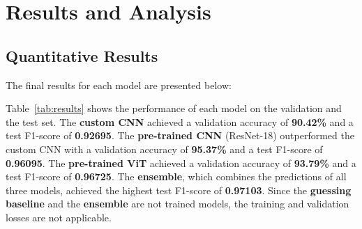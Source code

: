 \section{Results and Analysis}

\subsection{Quantitative Results}

The final results for each model are presented below:

\begin{table}[htbp]
    \caption{Quantitative results of the models on the train, validation and test set.}
    \begin{center}
    \end{center}
\end{table}

Table~\ref{tab:results} shows the performance of each model on the validation and the test set. The \textbf{custom CNN} achieved a validation accuracy of \textbf{90.42\%} and a test F1-score of \textbf{0.92695}. The \textbf{pre-trained CNN} (ResNet-18) outperformed the custom CNN with a validation accuracy of \textbf{95.37\%} and a test F1-score of \textbf{0.96095}. The \textbf{pre-trained ViT} achieved a validation accuracy of \textbf{93.79\%} and a test F1-score of \textbf{0.96725}. The \textbf{ensemble}, which combines the predictions of all three models, achieved the highest test F1-score of \textbf{0.97103}. Since the \textbf{guessing baseline} and the \textbf{ensemble} are not trained models, the training and validation losses are not applicable.

